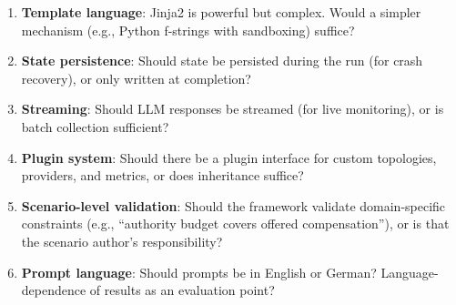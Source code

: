 \documentclass[12pt, a4paper]{article}
\begin{document}
\begin{enumerate}
    \item \textbf{Template language}: Jinja2 is powerful but complex. Would a simpler mechanism (e.g., Python f-strings with sandboxing) suffice?
    \item \textbf{State persistence}: Should state be persisted during the run (for crash recovery), or only written at completion?
    \item \textbf{Streaming}: Should LLM responses be streamed (for live monitoring), or is batch collection sufficient?
    \item \textbf{Plugin system}: Should there be a plugin interface for custom topologies, providers, and metrics, or does inheritance suffice?
    \item \textbf{Scenario-level validation}: Should the framework validate domain-specific constraints (e.g., ``authority budget covers offered compensation''), or is that the scenario author's responsibility?
    \item \textbf{Prompt language}: Should prompts be in English or German? Language-dependence of results as an evaluation point?
\end{enumerate}
\end{document}
